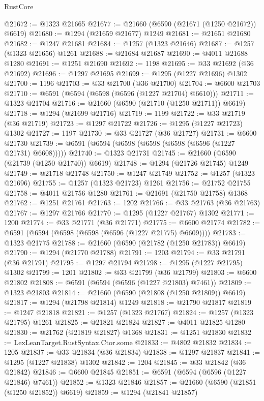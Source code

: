 \begin{lexlean}{RustCore}
\begin{coremodule}
@21672 := @1323 @21665
@21677 := @21660 (@6590 (@21671 (@1250 @21672)) @6619)
@21680 := @1294 (@21659 @21677) @1249
@21681 := @21651 @21680
@21682 := @1247 @21681
@21684 := @1257 (@1323 @21646)
@21687 := @1257 (@1323 @21656) @1261
@21688 := @21684 @21687
@21690 := @4011 @21688 @1280
@21691 := @1251 @21690
@21692 := 1198
@21695 := @33 @21692 (@36 @21692)
@21696 := @1297 @21695
@21699 := @1295 (@1227 @21696) @1302
@21700 := 1196
@21703 := @33 @21700 (@36 @21700)
@21704 := @6600 @21703
@21710 := @6591 (@6594 (@6598 (@6596 (@1227 @21704) @6610)))
@21711 := @1323 @21704
@21716 := @21660 (@6590 (@21710 (@1250 @21711)) @6619)
@21718 := @1294 (@21699 @21716)
@21719 := 1199
@21722 := @33 @21719 (@36 @21719)
@21723 := @1297 @21722
@21726 := @1295 (@1227 @21723) @1302
@21727 := 1197
@21730 := @33 @21727 (@36 @21727)
@21731 := @6600 @21730
@21739 := @6591 (@6594 (@6598 (@6598 (@6598 (@6596 (@1227 @21731) @6608)))))
@21740 := @1323 @21731
@21745 := @21660 (@6590 (@21739 (@1250 @21740)) @6619)
@21748 := @1294 (@21726 @21745) @1249
@21749 := @21718 @21748
@21750 := @1247 @21749
@21752 := @1257 (@1323 @21696)
@21755 := @1257 (@1323 @21723) @1261
@21756 := @21752 @21755
@21758 := @4011 @21756 @1280
@21761 := @21691 (@21750 @21758) @1368
@21762 := @1251 @21761
@21763 := 1202
@21766 := @33 @21763 (@36 @21763)
@21767 := @1297 @21766
@21770 := @1295 (@1227 @21767) @1302
@21771 := 1200
@21774 := @33 @21771 (@36 @21771)
@21775 := @6600 @21774
@21782 := @6591 (@6594 (@6598 (@6598 (@6596 (@1227 @21775) @6609))))
@21783 := @1323 @21775
@21788 := @21660 (@6590 (@21782 (@1250 @21783)) @6619)
@21790 := @1294 (@21770 @21788)
@21791 := 1203
@21794 := @33 @21791 (@36 @21791)
@21795 := @1297 @21794
@21798 := @1295 (@1227 @21795) @1302
@21799 := 1201
@21802 := @33 @21799 (@36 @21799)
@21803 := @6600 @21802
@21808 := @6591 (@6594 (@6596 (@1227 @21803) @7461))
@21809 := @1323 @21803
@21814 := @21660 (@6590 (@21808 (@1250 @21809)) @6619)
@21817 := @1294 (@21798 @21814) @1249
@21818 := @21790 @21817
@21819 := @1247 @21818
@21821 := @1257 (@1323 @21767)
@21824 := @1257 (@1323 @21795) @1261
@21825 := @21821 @21824
@21827 := @4011 @21825 @1280
@21830 := @21762 (@21819 @21827) @1368
@21831 := @1251 @21830
@21832 := LexLeanTarget.RustSyntax.Ctor.some
@21833 := @4802 @21832
@21834 := 1205
@21837 := @33 @21834 (@36 @21834)
@21838 := @1297 @21837
@21841 := @1295 (@1227 @21838) @1302
@21842 := 1204
@21845 := @33 @21842 (@36 @21842)
@21846 := @6600 @21845
@21851 := @6591 (@6594 (@6596 (@1227 @21846) @7461))
@21852 := @1323 @21846
@21857 := @21660 (@6590 (@21851 (@1250 @21852)) @6619)
@21859 := @1294 (@21841 @21857)

\end{coremodule}
\end{lexlean}
